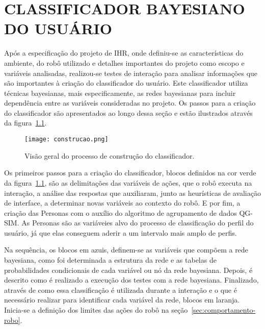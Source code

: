 \chapter{CLASSIFICADOR BAYESIANO DO USUÁRIO}
\label{cap:proposta}
Após a especificação do projeto de IHR, onde definiu-se as características do ambiente, do robô utilizado e detalhes importantes do projeto como escopo e variáveis analisadas, realizou-se testes de interação para analisar informações que são importantes à criação do classificador do usuário. Este classificador utiliza técnicas bayesianas, mais especificamente, as redes bayesianas para incluir dependência entre as variáveis consideradas no projeto. Os passos para a criação do classificador são apresentados ao longo dessa seção e estão ilustrados através da figura~\ref{fig:construcao}.

\begin{figure}[ht!]
	\centering
	\begin{minipage}{\textwidth}
		\caption{Visão geral do processo de construção do classificador.}
		\texttt{[image: construcao.png]}
		\label{fig:construcao}
	\end{minipage}
\end{figure}

Os primeiros passos para a criação do classificador, blocos definidos na cor verde da figura~\ref{fig:construcao}, são as delimitações das variáveis de ações, que o robô executa na interação, a análise das respostas que auxiliaram, junto as heurísticas de avaliação de interface, a determinar novas variáveis ao contexto do robô. E por fim, a criação das Personas com o auxílio do algoritmo de agrupamento de dados QG-SIM. As Personas são as variáveies alvo do processo de classificação do perfil do usuário, já que elas conseguem aderir a um intervalo mais amplo de perfis.

Na sequência, os blocos em azuis, definem-se as variáveis que compõem a rede bayesiana, como foi determinada a estrutura da rede e as tabelas de probabilidades condicionais de cada variável ou nó da rede bayesiana. Depois, é descrito como é realizado a execução dos testes com a rede bayesiana. Finalizado, através de como essa classificação é utilizada durante a interação e o que é necessário realizar para identificar cada variável da rede, blocos em laranja. Inicia-se a definição dos limites das ações do robô na seção~\ref{sec:comportamento-robo}.

